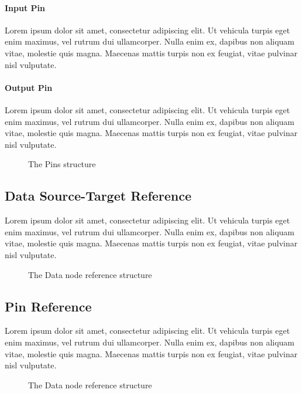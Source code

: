 \paragraph{Input Pin}

Lorem ipsum dolor sit amet, consectetur adipiscing elit. Ut vehicula turpis eget enim maximus, vel rutrum dui ullamcorper. Nulla enim ex, dapibus non aliquam vitae, molestie quis magna. Maecenas mattis turpis non ex feugiat, vitae pulvinar nisl vulputate.

\paragraph{Output Pin}

Lorem ipsum dolor sit amet, consectetur adipiscing elit. Ut vehicula turpis eget enim maximus, vel rutrum dui ullamcorper. Nulla enim ex, dapibus non aliquam vitae, molestie quis magna. Maecenas mattis turpis non ex feugiat, vitae pulvinar nisl vulputate.

\begin{figure}[!ht]
\centering

\caption{The Pins structure}
\label{fig:pins}
\end{figure}

\subsection{Data Source-Target Reference}

Lorem ipsum dolor sit amet, consectetur adipiscing elit. Ut vehicula turpis eget enim maximus, vel rutrum dui ullamcorper. Nulla enim ex, dapibus non aliquam vitae, molestie quis magna. Maecenas mattis turpis non ex feugiat, vitae pulvinar nisl vulputate.

\begin{figure}[!ht]
	\centering
	
	\caption{The Data node reference structure}
	\label{fig:data_source_target_reference}
\end{figure}

\subsection{Pin Reference}

Lorem ipsum dolor sit amet, consectetur adipiscing elit. Ut vehicula turpis eget enim maximus, vel rutrum dui ullamcorper. Nulla enim ex, dapibus non aliquam vitae, molestie quis magna. Maecenas mattis turpis non ex feugiat, vitae pulvinar nisl vulputate.

\begin{figure}[!ht]
	\centering
	
	\caption{The Data node reference structure}
	\label{fig:pin_reference}
\end{figure}
